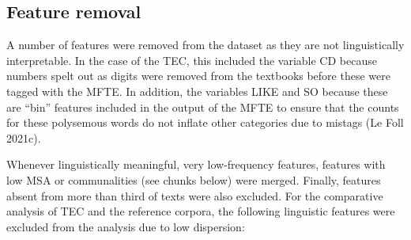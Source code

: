 \documentclass[
  letterpaper,
  DIV=11,
  numbers=noendperiod]{scrreprt}
\begin{document}
\subsection{Feature removal}\label{feature-removal-1}

A number of features were removed from the dataset as they are not
linguistically interpretable. In the case of the TEC, this included the
variable CD because numbers spelt out as digits were removed from the
textbooks before these were tagged with the MFTE. In addition, the
variables LIKE and SO because these are ``bin'' features included in the
output of the MFTE to ensure that the counts for these polysemous words
do not inflate other categories due to mistags (Le Foll 2021c).

Whenever linguistically meaningful, very low-frequency features,
features with low MSA or communalities (see chunks below) were merged.
Finally, features absent from more than third of texts were also
excluded. For the comparative analysis of TEC and the reference corpora,
the following linguistic features were excluded from the analysis due to
low dispersion:
\end{document}
